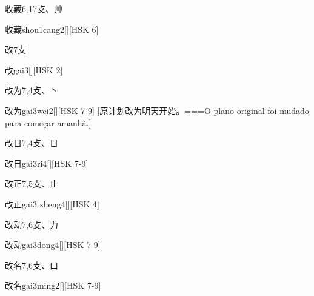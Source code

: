 \begin{Entry}{收藏}{6,17}{⽁、⾋}
  \begin{Phonetics}{收藏}{shou1cang2}[][HSK 6]
  \end{Phonetics}
\end{Entry}

\begin{Entry}{改}{7}{⽁}
  \begin{Phonetics}{改}{gai3}[][HSK 2]
  \end{Phonetics}
\end{Entry}

\begin{Entry}{改为}{7,4}{⽁、⼂}
  \begin{Phonetics}{改为}{gai3wei2}[][HSK 7-9]
    [原计划改为明天开始。===O plano original foi mudado para começar amanhã.]
  \end{Phonetics}
\end{Entry}

\begin{Entry}{改日}{7,4}{⽁、⽇}
  \begin{Phonetics}{改日}{gai3ri4}[][HSK 7-9]
  \end{Phonetics}
\end{Entry}

\begin{Entry}{改正}{7,5}{⽁、⽌}
  \begin{Phonetics}{改正}{gai3 zheng4}[][HSK 4]
  \end{Phonetics}
\end{Entry}

\begin{Entry}{改动}{7,6}{⽁、⼒}
  \begin{Phonetics}{改动}{gai3dong4}[][HSK 7-9]
  \end{Phonetics}
\end{Entry}

\begin{Entry}{改名}{7,6}{⽁、⼝}
  \begin{Phonetics}{改名}{gai3ming2}[][HSK 7-9]
  \end{Phonetics}
\end{Entry}


